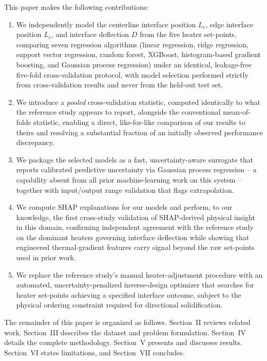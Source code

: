 \documentclass[conference]{IEEEtran}
\begin{document}
This paper makes the following contributions:
\begin{enumerate}
\item We independently model the centerline interface position $L_c$, edge interface position $L_e$, and interface deflection $D$ from the five heater set-points, comparing seven regression algorithms (linear regression, ridge regression, support vector regression, random forest, XGBoost, histogram-based gradient boosting, and Gaussian process regression) under an identical, leakage-free five-fold cross-validation protocol, with model selection performed strictly from cross-validation results and never from the held-out test set.
\item We introduce a \emph{pooled} cross-validation statistic, computed identically to what the reference study appears to report, alongside the conventional mean-of-folds statistic, enabling a direct, like-for-like comparison of our results to theirs and resolving a substantial fraction of an initially observed performance discrepancy.
\item We package the selected models as a fast, uncertainty-aware surrogate that reports calibrated predictive uncertainty via Gaussian process regression -- a capability absent from all prior machine-learning work on this system -- together with input/output range validation that flags extrapolation.
\item We compute SHAP explanations for our models and perform, to our knowledge, the first cross-study validation of SHAP-derived physical insight in this domain, confirming independent agreement with the reference study on the dominant heaters governing interface deflection while showing that engineered thermal-gradient features carry signal beyond the raw set-points used in prior work.
\item We replace the reference study's manual heater-adjustment procedure with an automated, uncertainty-penalized inverse-design optimizer that searches for heater set-points achieving a specified interface outcome, subject to the physical ordering constraint required for directional solidification.
\end{enumerate}

The remainder of this paper is organized as follows. Section~II reviews related work. Section~III describes the dataset and problem formulation. Section~IV details the complete methodology. Section~V presents and discusses results. Section~VI states limitations, and Section~VII concludes.
\end{document}
